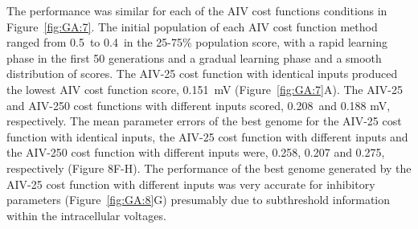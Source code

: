 The {\GA} performance was similar for each of the AIV cost functions
conditions in Figure~\ref{fig:GA:7}. The initial population of each AIV
cost function method ranged from 0.5~to 0.4~in the 25-75\% population
score, with a rapid learning phase in the first 50 generations and a
gradual learning phase and a smooth distribution of scores.  The
AIV-25 cost function with identical {\ANF} inputs produced the lowest AIV
cost function score, 0.151~mV (Figure~\ref{fig:GA:7}A).  The AIV-25 and
AIV-250 cost functions with different inputs scored, 0.208~and 0.188
mV, respectively.  The mean parameter errors of the best genome for
the AIV-25 cost function with identical inputs, the AIV-25 cost
function with different inputs and the AIV-250 cost function with
different inputs were, 0.258, 0.207 and 0.275, respectively (Figure
8F-H).  The performance of the best genome generated by the AIV-25
cost function with different inputs was very accurate for inhibitory
parameters (Figure~\ref{fig:GA:8}G) presumably due to subthreshold
information within the intracellular voltages. 


